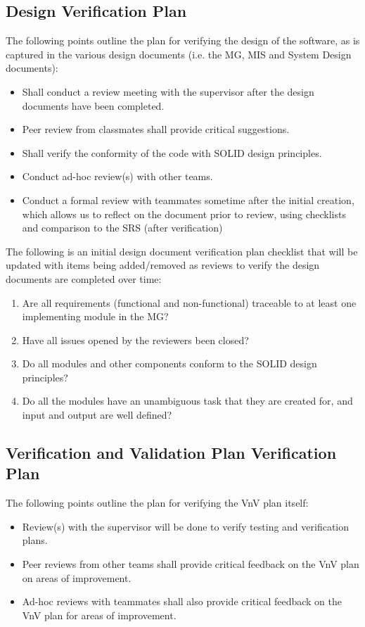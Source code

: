 \documentclass[12pt, titlepage]{article}
\begin{document}
\subsection{Design Verification Plan}
The following points outline the plan for verifying the design of the software, as is captured in the various design documents (i.e. the MG, MIS and System Design documents):
\begin{itemize}
    \item Shall conduct a review meeting with the supervisor after the design documents have been completed. 
    \item Peer review from classmates shall provide critical suggestions.
    \item Shall verify the conformity of the code with SOLID design principles.
    \item Conduct ad-hoc review(s) with other teams.
    \item Conduct a formal review with teammates sometime after the initial creation, which allows us to reflect on the document prior to review, using checklists and comparison to the SRS (after verification)
\end{itemize}

\noindent The following is an initial design document verification plan checklist that will be updated with items being added/removed as reviews to verify the design documents are completed over time:
\begin{enumerate}[label=$\square$]
    \item Are all requirements (functional and non-functional) traceable to at least one implementing module in the MG?
    \item Have all issues opened by the reviewers been closed?
    \item Do all modules and other components conform to the SOLID design principles?
    \item Do all the modules have an unambiguous task that they are created for, and input and output are well defined?
\end{enumerate}

\subsection{Verification and Validation Plan Verification Plan}
The following points outline the plan for verifying the VnV plan itself:
\begin{itemize}
    \item Review(s) with the supervisor will be done to verify testing and verification plans. 
    \item Peer reviews from other teams shall provide critical feedback on the VnV plan on areas of improvement.
    \item Ad-hoc reviews with teammates shall also provide critical feedback on the VnV plan for areas of improvement.
\end{itemize}
\end{document}
